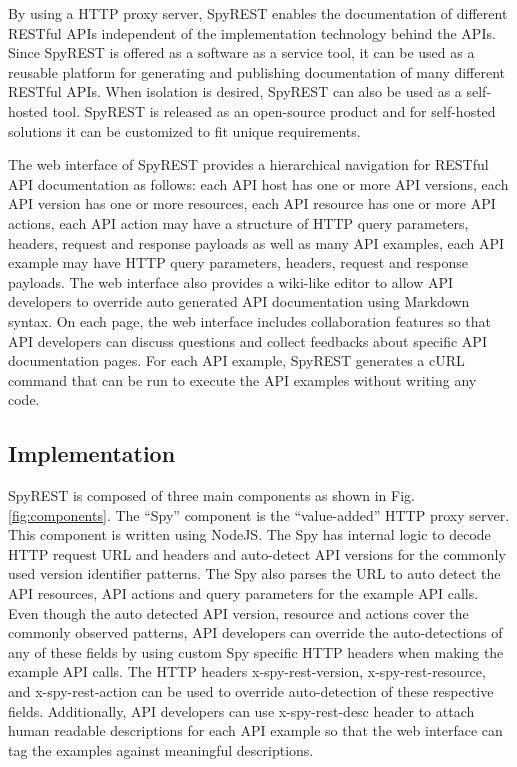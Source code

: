 \documentclass[conference]{IEEEtran}
\begin{document}
By using a HTTP proxy server, SpyREST enables the documentation of different RESTful APIs independent of the implementation technology behind the APIs. Since SpyREST is offered as a software as a service tool, it can be used as a reusable platform for generating and publishing documentation of many different RESTful APIs. When isolation is desired, SpyREST can also be used as a self-hosted tool. SpyREST is released as an open-source product and for self-hosted solutions it can be customized to fit unique requirements.

The web interface of SpyREST provides a hierarchical navigation for RESTful API documentation as follows: each API host has one or more API versions, each API version has one or more resources, each API resource has one or more API actions, each API action may have a structure of HTTP query parameters, headers, request and response payloads as well as many API examples, each API example may have HTTP query parameters, headers, request and response payloads. The web interface also provides a wiki-like editor to allow API developers to override auto generated API documentation using Markdown syntax. On each page, the web interface includes collaboration features so that API developers can discuss questions and collect feedbacks about specific API documentation pages. For each API example, SpyREST generates a cURL command that can be run to execute the API examples without writing any code.


\subsection{Implementation} %
\label{sub:implementation}

SpyREST is composed of three main components as shown in Fig. \ref{fig:components}. The ``Spy'' component is the ``value-added'' HTTP proxy server. This component is written using NodeJS. The Spy has internal logic to decode HTTP request URL and headers and auto-detect API versions for the commonly used version identifier patterns. The Spy also parses the URL to auto detect the API resources, API actions and query parameters for the example API calls. Even though the auto detected API version, resource and actions cover the commonly observed patterns, API developers can override the auto-detections of any of these fields by using custom Spy specific HTTP headers when making the example API calls. The HTTP headers x-spy-rest-version, x-spy-rest-resource, and x-spy-rest-action can be used to override auto-detection of these respective fields. Additionally, API developers can use x-spy-rest-desc header to attach human readable descriptions for each API example so that the web interface can tag the examples against meaningful descriptions.
\end{document}
